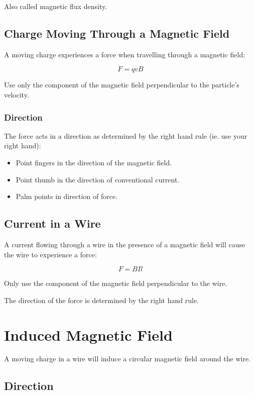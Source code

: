 \documentclass[a4paper,11pt]{article}
\begin{document}
Also called magnetic flux density.


\subsection{Charge Moving Through a Magnetic Field}

A moving charge experiences a force when travelling through a magnetic field:

$$
F = qvB
$$

Use only the component of the magnetic field perpendicular to the particle's
velocity.


\subsubsection{Direction}

The force acts in a direction as determined by the right hand rule (ie. use
your right hand):

\begin{itemize}
\item Point fingers in the direction of the magnetic field.
\item Point thumb in the direction of conventional current.
\item Palm points in direction of force.
\end{itemize}


\subsection{Current in a Wire}

A current flowing through a wire in the presence of a magnetic field will
cause the wire to experience a force:

$$
F = BIl
$$

Only use the component of the magnetic field perpendicular to the wire.

The direction of the force is determined by the right hand rule.




\section{Induced Magnetic Field}

A moving charge in a wire will induce a circular magnetic field around the
wire.


\subsection{Direction}
\end{document}

